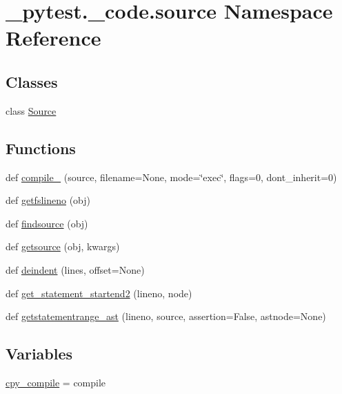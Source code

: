 \hypertarget{namespace__pytest_1_1__code_1_1source}{}\section{\+\_\+pytest.\+\_\+code.\+source Namespace Reference}
\label{namespace__pytest_1_1__code_1_1source}
\subsection*{Classes}
\begin{DoxyCompactItemize}
\item 
class \hyperlink{class__pytest_1_1__code_1_1source_1_1_source}{Source}
\end{DoxyCompactItemize}
\subsection*{Functions}
\begin{DoxyCompactItemize}
\item 
def \hyperlink{namespace__pytest_1_1__code_1_1source_a880c3f81c89810985d903019c632cce2}{compile\+\_\+} (source, filename=None, mode=\char`\"{}exec\char`\"{}, flags=0, dont\+\_\+inherit=0)
\item 
def \hyperlink{namespace__pytest_1_1__code_1_1source_a898c9e9866d45b01be4a377121197029}{getfslineno} (obj)
\item 
def \hyperlink{namespace__pytest_1_1__code_1_1source_ad4647a725198f413607fc6a33166c742}{findsource} (obj)
\item 
def \hyperlink{namespace__pytest_1_1__code_1_1source_a9badfc85c26fa72c5a02d62da993cfc2}{getsource} (obj, kwargs)
\item 
def \hyperlink{namespace__pytest_1_1__code_1_1source_a7a11c4b808daa88d8c1ec05f7e2e934f}{deindent} (lines, offset=None)
\item 
def \hyperlink{namespace__pytest_1_1__code_1_1source_ad2722e6aaa4eca513ba22384d317672a}{get\+\_\+statement\+\_\+startend2} (lineno, node)
\item 
def \hyperlink{namespace__pytest_1_1__code_1_1source_a7e55b7f4027353801bdd01a053468d5d}{getstatementrange\+\_\+ast} (lineno, source, assertion=False, astnode=None)
\end{DoxyCompactItemize}
\subsection*{Variables}
\begin{DoxyCompactItemize}
\item 
\hyperlink{namespace__pytest_1_1__code_1_1source_aeea9fd65c04e5ab8aa858f4972f9f6b0}{cpy\+\_\+compile} = compile
\end{DoxyCompactItemize}



